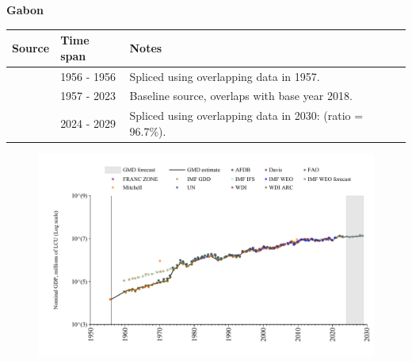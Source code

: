 \documentclass[12pt,a4paper,landscape]{article}
\begin{document}
\begin{adjustbox}{max totalsize={\paperwidth}{\paperheight},center}
\begin{minipage}[t][\textheight][t]{\textwidth}
\vspace*{0.5cm}
{}
\begin{center}
{\Large\bfseries Gabon}
\end{center}
\vspace{0.5cm}
\begin{table}[H]
\centering
\small
\begin{tabular}{|l|l|l|}
\hline
\textbf{Source} & \textbf{Time span} & \textbf{Notes} \\
\hline
\rowcolor{white}\cite{Mitchell}& 1956 - 1956 &Spliced using overlapping data in 1957.\\
\rowcolor{lightgray}\cite{WDI}& 1957 - 2023 &Baseline source, overlaps with base year 2018.\\
\rowcolor{white}\cite{IMF_WEO_forecast}& 2024 - 2029 &Spliced using overlapping data in 2030: (ratio = 96.7\%).\\
\hline
\end{tabular}
\end{table}
\begin{figure}[H]
\centering
\includegraphics[width=\textwidth,height=0.6\textheight,keepaspectratio]{graphs/GAB_nGDP.pdf}
\end{figure}
\end{minipage}
\end{adjustbox}
\end{document}
